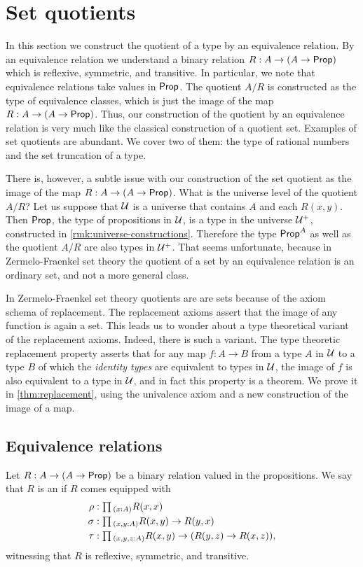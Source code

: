 \section{Set quotients}

In this section we construct the quotient of a type by an equivalence relation. By an equivalence relation we understand a binary relation $R:A\to(A\to\mathsf{Prop})$ which is reflexive, symmetric, and transitive. In particular, we note that equivalence relations take values in $\mathsf{Prop}$. The quotient $A/R$ is constructed as the type of equivalence classes, which is just the image of the map $R:A\to (A\to\mathsf{Prop})$. Thus, our construction of the quotient by an equivalence relation is very much like the classical construction of a quotient set. Examples of set quotients are abundant. We cover two of them: the type of rational numbers and the set truncation of a type.

There is, however, a subtle issue with our construction of the set quotient as the image of the map $R:A\to(A\to\mathsf{Prop})$. What is the universe level of the quotient $A/R$? Let us suppose that $\mathcal{U}$ is a universe that contains $A$ and each $R(x,y)$. Then $\mathsf{Prop}$, the type of propositions in $\mathcal{U}$, is a type in the universe $\mathcal{U}^+$, constructed in \cref{rmk:universe-constructions}. Therefore the type $\mathsf{Prop}^A$ as well as the quotient $A/R$ are also types in $\mathcal{U}^+$. That seems unfortunate, because in Zermelo-Fraenkel set theory the quotient of a set by an equivalence relation is an ordinary set, and not a more general class.

In Zermelo-Fraenkel set theory quotients are are sets because of the axiom schema of replacement. The replacement axioms assert that the image of any function is again a set. This leads us to wonder about a type theoretical variant of the replacement axioms. Indeed, there is such a variant. The type theoretic replacement property asserts that for any map $f:A\to B$ from a type $A$ in $\mathcal{U}$ to a type $B$ of which the \emph{identity types} are equivalent to types in $\mathcal{U}$, the image of $f$ is also equivalent to a type in $\mathcal{U}$, and in fact this property is a theorem. We prove it in \cref{thm:replacement}, using the univalence axiom and a new construction of the image of a map.

\subsection{Equivalence relations}

\begin{defn}\label{defn:eq_rel}
Let $R:A\to (A\to\mathsf{Prop})$ be a binary relation valued in the propositions. We say that $R$ is an  if $R$ comes equipped with
\begin{align*}
\rho & : \prd{x:A}R(x,x) \\
\sigma & : \prd{x,y:A} R(x,y)\to R(y,x) \\
\tau & : \prd{x,y,z:A} R(x,y)\to (R(y,z)\to R(x,z)),
\end{align*}
witnessing that $R$ is reflexive, symmetric, and transitive.
\end{defn}

